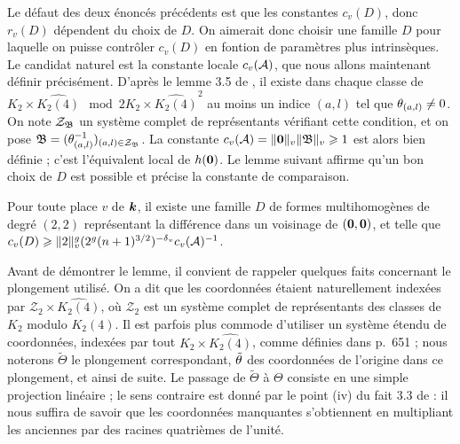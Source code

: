 \documentclass{mpg-preth}
\begin{document}
Le défaut des deux énoncés précédents est que les constantes $c_v(D)$, donc
$r_v(D)$ dépendent  du choix de $D$. On aimerait donc choisir une
famille $D$ pour laquelle on puisse contrôler $c_v(D)$ en fontion de paramètres
plus intrinsèques. Le candidat naturel est la constante locale $c_v(\mathcal{A})$, que
nous allons maintenant définir précisément. D'après le lemme 3.5 de
\cite{daphimhva2}, il existe dans chaque classe de $K_2 \times
\widehat{K_2(4)} \mod 2K_2 \times \widehat{K_2(4)}^2$ au moins un indice $(a,
l)$ tel que $\theta_{(a,l)} \neq 0$. On note $\mathcal{Z}_{\mathfrak{B}}$ un système complet
de représentants vérifiant cette condition, et on pose $\mathfrak{B} = (\theta_{(a,
l)}^{-1})_{(a, l) \in \mathcal{Z}_{\mathfrak{B}}}$. La constante $c_v(\mathcal{A}) =
\lVert{\boldsymbol{0}}\rVert_{v}\lVert\mathfrak{B}\rVert_{v} \geqslant 1$ est alors bien définie ; c'est l'équivalent local de
$h({\boldsymbol{0}})$. Le lemme suivant affirme qu'un bon choix de $D$ est possible et
précise la constante de comparaison.

\begin{lem} \label{RayonAbs}
  Pour toute place $v$ de $\boldsymbol{k}$, il existe une famille $D$ de formes
  multihomogènes de degré $(2, 2)$ représentant la différence dans un
  voisinage de $({\boldsymbol{0}}, {\boldsymbol{0}})$, et telle que $c_v(D) \geqslant
  \lVert2\rVert_{v}^g(2^g(n+1)^{3/2})^{-{\delta\smash{_v}}} c_v(\mathcal{A})^{-1}$.
\end{lem}

Avant de démontrer le lemme, il convient de rappeler quelques faits concernant
le plongement utilisé. On a dit que les coordonnées étaient naturellement
indexées par $\mathcal{Z}_2 \times \widehat{K_2(4)}$, où $\mathcal{Z}_2$ est
un système complet de représentants des classes de $K_2$ modulo $K_2(4)$. Il
est parfois plus commode d'utiliser un système étendu de coordonnées, indexées
par tout $K_2 \times \widehat{K_2(4)}$, comme définies dans
\cite{daphimhva2} p.~651 ; nous noterons $\tilde{\Theta}$ le plongement
correspondant, $\tilde{\theta}$ des coordonnées de l'origine dans ce plongement,
et ainsi de suite. Le passage de $\tilde{\Theta}$ à $\Theta$ consiste en une
simple projection linéaire ; le sens contraire est donné par le point (iv) du
fait 3.3 de  : il nous suffira de savoir que les coordonnées
manquantes s'obtiennent en multipliant les anciennes par des racines
quatrièmes de l'unité.
\end{document}

